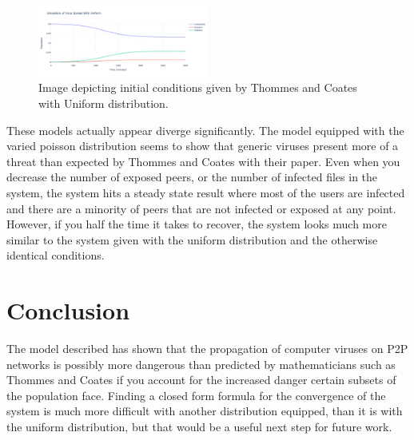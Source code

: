 \documentclass[12pt, oneside]{article}
\begin{document}
        \begin{figure}[htbp]
            \centering
            \includegraphics[width=0.5\textwidth]{2MUniform.png}
            \caption{Image depicting initial conditions given by Thommes and Coates with Uniform distribution.}
        \end{figure}
        These models actually appear diverge significantly. The model equipped with the varied poisson distribution seems to show that generic viruses present more of a threat than expected by Thommes and Coates
        with their paper. Even when you decrease the number of exposed peers, or the number of infected files in the system, the system hits a steady state result where
        most of the users are infected and there are a minority of peers that are not infected or exposed at any point. However, if you half the time it takes to recover, the system looks much more similar to the
        system given with the uniform distribution and the otherwise identical conditions.
    
    \section{Conclusion}
        The model described has shown that the propagation of computer viruses on P2P networks is possibly more dangerous than predicted by mathematicians such as Thommes and Coates if
        you account for the increased danger certain subsets of the population face. Finding a closed form formula for the convergence of the system is much more difficult with another distribution equipped, 
        than it is with the uniform distribution, but that would be a useful next step for future work. 




\end{document}
